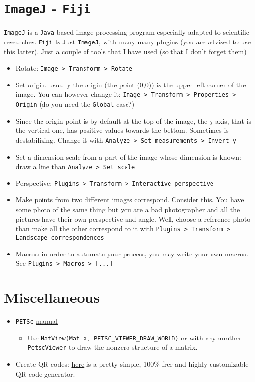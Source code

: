 \documentclass[a4paper,12pt,%
              final%
              ]{article}
\begin{document}
\section{\texttt{ImageJ} - \texttt{Fiji}}
\texttt{ImageJ} is a \texttt{Java}-based image processing program especially adapted to scientific researches. \texttt{Fiji} Is Just \texttt{ImageJ}, with many many plugins (you are advised to use this latter). Just a couple of tools that I have used (so that I don't forget them)
\begin{itemize}
  \item Rotate: \texttt{Image > Transform > Rotate}
  \item Set origin: usually the origin (the point (0,0)) is the upper left corner of the image. You can however change it: \texttt{Image > Transform > Properties > Origin} (do you need the \texttt{Global} case?)
  \item Since the origin point is by default at the top of the image, the y axis, that is the vertical one, has positive values towards the bottom. Sometimes is destabilizing. Change it with \texttt{Analyze > Set measurements > Invert y}
  \item Set a dimension scale from a part of the image whose dimension is known: draw a line than \texttt{Analyze > Set scale}
  \item Perspective: \texttt{Plugins > Transform > Interactive perspective}
  \item Make points from two different images correspond. Consider this. You have some photo of the same thing but you are a bad photographer and all the pictures have their own perspective and angle. Well, choose a reference photo than make all the other correspond to it with \texttt{Plugins > Transform > Landscape correspondences}
  \item Macros: in order to automate your process, you may write your own macros. See \texttt{Plugins > Macros > [...]}
\end{itemize}

\section{Miscellaneous}
\label{sec:misc}
\begin{itemize}
  \item \texttt{PETSc} \href{https://www.mcs.anl.gov/petsc/petsc-current/docs/manual.pdf}{manual}
    \begin{itemize}
      \item Use \verb|MatView(Mat a, PETSC_VIEWER_DRAW_WORLD)| or with any another \texttt{PetscViewer} to draw the nonzero structure of a matrix.
    \end{itemize}
  \item Create QR-codes: \href{https://www.qrcode-monkey.com/}{here} is a pretty simple, 100\% free and highly customizable QR-code generator.
\end{itemize}
\end{document}
